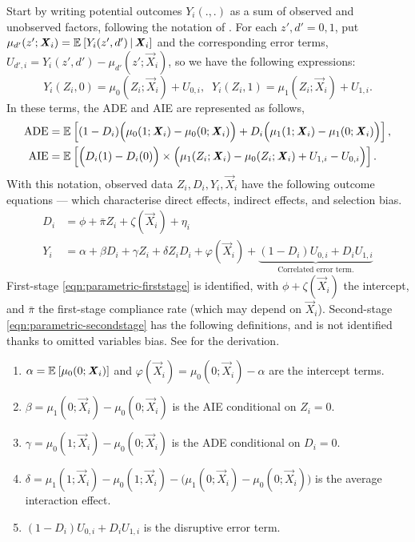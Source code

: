 Start by writing potential outcomes $Y_i(., .)$ as a sum of observed and unobserved factors, following the notation of \cite{heckman2005structural}.
For each $z',d' = 0,1$, put $\mu_{d'}(z'; \boldsymbol{\mathit{X}}_i) = \mathbb{E}_{} \left[ Y_i(z', d') \, \middle\vert \, \boldsymbol{\mathit{X}}_i \right]$ and the corresponding error terms, $U_{d', i} = Y_i(z', d') - \mu_{d'}(z'; \vec X_i)$, so we have the following expressions:
\[ Y_i(Z_i, 0)  = \mu_{0}(Z_i; \vec X_i) + U_{0,i}, \;\;
    Y_i(Z_i, 1) = \mu_{1}(Z_i; \vec X_i) + U_{1,i}. \]
In these terms, the ADE and AIE are represented as follows,
\begin{align*}
    \text{ADE}
    &= \mathbb{E}_{} \left[  (1 - D_i) \Big( \mu_{0}(1; \boldsymbol{\mathit{X}}_i) - \mu_{0}(0; \boldsymbol{\mathit{X}}_i) \Big)
        + D_i \Big( \mu_{1}(1; \boldsymbol{\mathit{X}}_i) - \mu_{1}(0; \boldsymbol{\mathit{X}}_i) \Big) \right], \\
    \text{AIE}
        &= \mathbb{E}_{} \left[ \Big( D_i(1) - D_i(0) \Big)
        \times \Big( \mu_1(Z_i; \boldsymbol{\mathit{X}}_i) - \mu_0(Z_i; \boldsymbol{\mathit{X}}_i) + U_{1,i} - U_{0,i}\Big)  \right].
\end{align*}
With this notation, observed data $Z_i, D_i, Y_i, \vec X_i$ have the following outcome equations --- which characterise direct effects, indirect effects, and selection bias.
\begin{align}
    \label{eqn:parametric-firststage}
    D_i &= \phi + \bar \pi Z_i + \zeta(\vec X_i) + \eta_i  \\
    \label{eqn:parametric-secondstage}
    Y_i &= \alpha + \beta D_i + \gamma Z_i + \delta Z_i D_i
    + \varphi(\vec X_i)
    + \underbrace{ \left(1 - D_i \right) U_{0,i} + D_i U_{1,i}}_{
        \text{Correlated error term.}}
\end{align}
First-stage \eqref{eqn:parametric-firststage} is identified, with $\phi + \zeta(\vec X_i)$ the intercept, and $\bar \pi$ the first-stage compliance rate (which may depend on $\vec X_i$).
Second-stage \eqref{eqn:parametric-secondstage} has the following definitions, and is not identified thanks to omitted variables bias.
See  for the derivation.
\begin{enumerate}[label=\textbf{(\alph*)}]
    \item $\alpha = \mathbb{E}_{} \left[ \mu_0(0; \boldsymbol{\mathit{X}}_i) \right]$ and $\varphi(\vec X_i) = \mu_0(0; \vec X_i) - \alpha$ are the intercept terms.
    \item $\beta = \mu_1(0; \vec X_i) - \mu_0(0; \vec X_i)$ is the AIE conditional on $Z_i = 0$.
    \item $\gamma = \mu_0(1; \vec X_i) - \mu_0(0; \vec X_i)$ is the ADE conditional on $D_i = 0$.
    \item $\delta = \mu_1(1; \vec X_i) - \mu_0(1; \vec X_i) - \big( \mu_1(0; \vec X_i) - \mu_0(0; \vec X_i) \big)$ is the average interaction effect.
    \item $\left( 1 - D_i \right) U_{0,i} + D_i U_{1,i}$ is the disruptive error term.
\end{enumerate}

